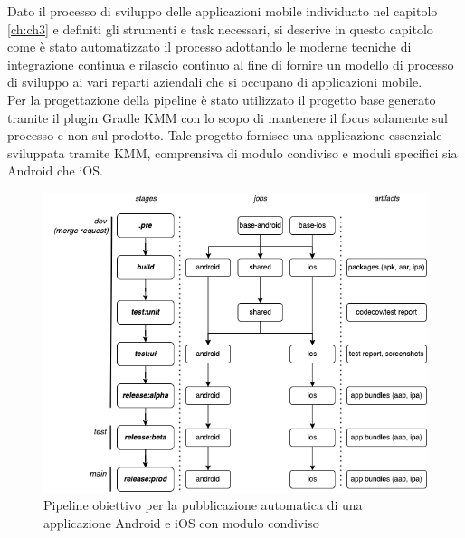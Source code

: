 
Dato il processo di sviluppo delle applicazioni mobile individuato nel capitolo \ref{ch:ch3} e definiti gli strumenti e task necessari, si descrive in questo capitolo come è stato automatizzato il processo adottando le moderne tecniche di integrazione continua e rilascio continuo al fine di fornire un modello di processo di sviluppo ai vari reparti aziendali che si occupano di applicazioni mobile.\\
Per la progettazione della pipeline è stato utilizzato il progetto base generato tramite il plugin Gradle KMM con lo scopo di mantenere il focus solamente sul processo e non sul prodotto. Tale progetto fornisce una applicazione essenziale sviluppata tramite KMM, comprensiva di modulo condiviso e moduli specifici sia Android che iOS.


\begin{figure}[H]
\centering
\includegraphics[width=1\textwidth]{img/tesi-11-cicd.drawio.png}
\caption{Pipeline obiettivo per la pubblicazione automatica di una applicazione Android e iOS con modulo condiviso}
\end{figure}

